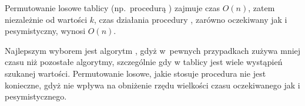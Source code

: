 \subproblem %
Permutowanie losowe tablicy (np.\ procedurą ) zajmuje czas $O(n)$, zatem niezależnie od wartości $k$, czas działania procedury , zarówno oczekiwany jak i pesymistyczny, wynosi $O(n)$.

\subproblem %
Najlepszym wyborem jest algorytm , gdyż w~pewnych przypadkach zużywa mniej czasu niż pozostałe algorytmy, szczególnie gdy w tablicy jest wiele wystąpień szukanej wartości. Permutowanie losowe, jakie stosuje procedura  nie jest konieczne, gdyż nie wpływa na obniżenie rzędu wielkości czasu oczekiwanego jak i pesymistycznego.

\endinput
